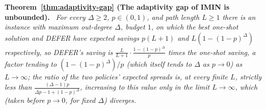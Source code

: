 \documentclass[11pt]{article}
\theoremstyle{definition}
\theoremstyle{remark}
\newenvironment{repeattheorem}[1][]{\par\medskip\noindent\textbf{#1.}\ \itshape}{\par\medskip}
\begin{document}
\begin{repeattheorem}[Theorem~\ref{thm:adaptivity-gap} (The adaptivity gap of IMIN is unbounded)]
For every $\Delta\ge 2$, $p\in(0,1)$, and path length $L\ge1$ there is an
instance with maximum out-degree $\Delta$, budget $1$, on which the best
one-shot solution and DEFER have expected savings $p(L+1)$ and
$L(1-(1-p)^\Delta)$ respectively, so DEFER's saving is
$\frac{L}{L+1}\cdot\frac{1-(1-p)^\Delta}{p}$ times the one-shot saving, a
factor tending to $(1-(1-p)^\Delta)/p$ (which itself tends to $\Delta$ as
$p\to0$) as $L\to\infty$; the ratio of the two policies' expected spreads
is, at every finite $L$, strictly \emph{less} than
$\frac{(\Delta-1)p}{\Delta p-1+(1-p)^\Delta}$, increasing to this value only
in the limit $L\to\infty$, which (taken before $p\to0$, for fixed $\Delta$)
diverges.
\end{repeattheorem}
\end{document}
